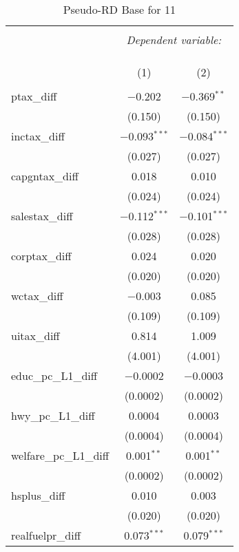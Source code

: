 
\begin{table}[!htbp] \centering 
  \caption{Pseudo-RD Base for  11} 
  \label{} 
\begin{tabular}{@{\extracolsep{5pt}}lcc} 
\\[-1.8ex]\hline 
\hline \\[-1.8ex] 
 & \multicolumn{2}{c}{\textit{Dependent variable:}} \\ 
\cline{2-3} 
\\[-1.8ex] & \multicolumn{2}{c}{ } \\ 
\\[-1.8ex] & (1) & (2)\\ 
\hline \\[-1.8ex] 
 ptax\_diff & $-$0.202 & $-$0.369$^{**}$ \\ 
  & (0.150) & (0.150) \\ 
  inctax\_diff & $-$0.093$^{***}$ & $-$0.084$^{***}$ \\ 
  & (0.027) & (0.027) \\ 
  capgntax\_diff & 0.018 & 0.010 \\ 
  & (0.024) & (0.024) \\ 
  salestax\_diff & $-$0.112$^{***}$ & $-$0.101$^{***}$ \\ 
  & (0.028) & (0.028) \\ 
  corptax\_diff & 0.024 & 0.020 \\ 
  & (0.020) & (0.020) \\ 
  wctax\_diff & $-$0.003 & 0.085 \\ 
  & (0.109) & (0.109) \\ 
  uitax\_diff & 0.814 & 1.009 \\ 
  & (4.001) & (4.001) \\ 
  educ\_pc\_L1\_diff & $-$0.0002 & $-$0.0003 \\ 
  & (0.0002) & (0.0002) \\ 
  hwy\_pc\_L1\_diff & 0.0004 & 0.0003 \\ 
  & (0.0004) & (0.0004) \\ 
  welfare\_pc\_L1\_diff & 0.001$^{**}$ & 0.001$^{**}$ \\ 
  & (0.0002) & (0.0002) \\ 
  hsplus\_diff & 0.010 & 0.003 \\ 
  & (0.020) & (0.020) \\ 
  realfuelpr\_diff & 0.073$^{***}$ & 0.079$^{***}$ \\ 

\end{tabular}
\end{table}
